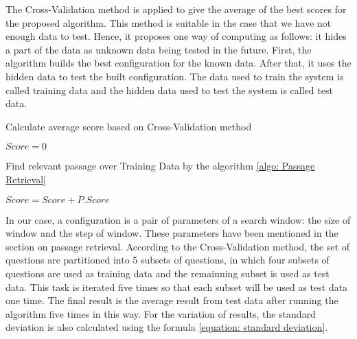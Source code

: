  The Cross-Validation method \cite{kohavi1995scv} is applied to give the average of the best scores for the proposed algorithm. This method is suitable in the case that we have not enough data to test. Hence, it proposes one way of computing as follows: it hides a part of the data as unknown data being tested in the future. First, the algorithm builds the best configuration for the known data. After that, it uses the hidden data to test the built configuration. The data used to train the system is called training data and the hidden data used to test the system is called test data.
 
 \begin{algorithm}
\caption{Calculate average score based on Cross-Validation method}
\label{alg: Cross-Validation}
\begin{algorithmic}
\STATE $Score = 0$

\STATE Find relevant passage over Training Data by the algorithm \ref{algo: Passage Retrieval}
			
			
\ENDFOR
\ENDFOR

\STATE $Score = Score + P.Score$
		
\ENDFOR
	

\end{algorithmic}
\end{algorithm}

In our case, a configuration is a pair of parameters of a search window: the size of window and the step of window. These parameters have been mentioned in the section on passage retrieval. According to the Cross-Validation method, the set of questions are partitioned into 5 subsets of questions, in which four subsets of questions are used as training data and the remainning subset is used as test data. This task is iterated five times so that each subset will be used as test data one time. The final result is the average result from test data after running the algorithm five times in this way. For the variation of results, the standard deviation is also calculated using the formula \ref{equation: standard deviation}. 

